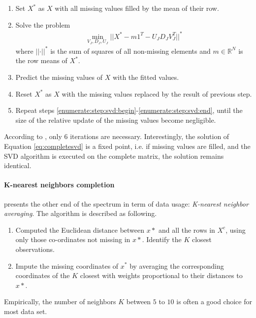 \begin{enumerate}[(1)]
\item  Set $X^*$ as $X$ with all missing values filled by the mean of their
  row.
\item \label{enumerate:step:svd:begin} Solve the problem
  \begin{align} \label{eq:completesvd}
    \min_{V_J, D_J, U_J} \vert \vert X^* - m 1^T - U_J D_J V_J^T \vert \vert^*
  \end{align}
  where $\vert\vert \cdot \vert\vert^*$ is the sum of squares of all non-missing
  elements and $m \in \mathbb{R}^N$ is the row means of $X^*$.
\item Predict the missing values of $X$ with the fitted values.
\item Reset $X^*$ as $X$ with the missing values replaced by the result of
  previous step.
\item \label{enumerate:step:svd:end} Repeat steps
  \ref{enumerate:step:svd:begin}-\ref{enumerate:step:svd:end}, until the size
  of the relative update of the missing values become negligible.
\end{enumerate}

According to \cite{hastie1999imputing}, only 6 iterations are
necessary. Interestingly, the solution of Equation \eqref{eq:completesvd} is a
fixed point, i.e. if missing values are filled, and the SVD algorithm is
executed on the complete matrix, the solution remains identical.


\paragraph{K-nearest neighbors completion}

\cite{troyanskaya2001missing} presents the other end of the spectrum in term of
data usage: \emph{K-nearest neighbor averaging}. The algorithm is described as
following.
\begin{enumerate}
  \item Computed the Euclidean distance between $x*$ and all the rows in $X^c$,
    using only those co-ordinates not missing in $x*$. Identify the $K$ closest
    observations.
  \item Impute the missing coordinates of $x^*$ by averaging the corresponding
    coordinates of the $K$ closest with weights proportional to their distances
    to $x*$.
\end{enumerate}

Empirically, the number of neighbors $K$ between $5$ to $10$ is often a good
choice for most data set.

